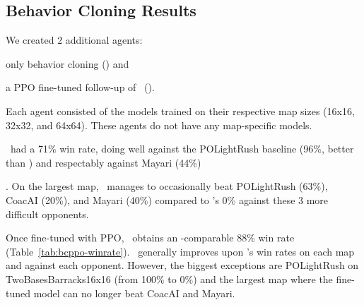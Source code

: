 \documentclass[conference]{IEEEtran}
\newif\ifsupplemental
\newcommand{\supptableref}[1]{%
  \ifsupplemental
    \ (Supplemental Table~\ref{#1})%
  \fi
}
\newcommand{\mapname}[1]{#1} %
\begin{document}
\subsection{Behavior Cloning Results}
\label{sec:behavior-cloning-results}
We created 2 additional agents:
\begin{inparaenum}[(1)]
    \item only behavior cloning (\bcAgent) and
    \item a PPO fine-tuned follow-up of \bcAgent\ (\bcPPOAgent).
\end{inparaenum}
Each agent consisted of the models trained on their
respective map sizes (16x16, 32x32, and 64x64). These agents do not have any
map-specific models.

\bcAgent\ had a 71\% win rate, doing well against the POLightRush baseline (96\%, better than \agentName) and respectably against
Mayari (44\%)\supptableref{tab:bc-winrate}. On the largest map, \bcAgent\ manages to occasionally beat POLightRush (63\%), CoacAI
(20\%), and Mayari (40\%) compared to \agentName's 0\% against these 3 more difficult opponents.

Once fine-tuned with PPO, \bcPPOAgent\ obtains an \agentName-comparable 88\% win rate
(Table~\ref{tab:bcppo-winrate}). \bcPPOAgent\ generally improves upon \bcAgent's win
rates on each map and against each opponent. However, the biggest exceptions are
POLightRush on \mapname{TwoBasesBarracks16x16} (from 100\% to 0\%) and the largest map
where the fine-tuned model can no longer beat CoacAI and Mayari.
\end{document}
